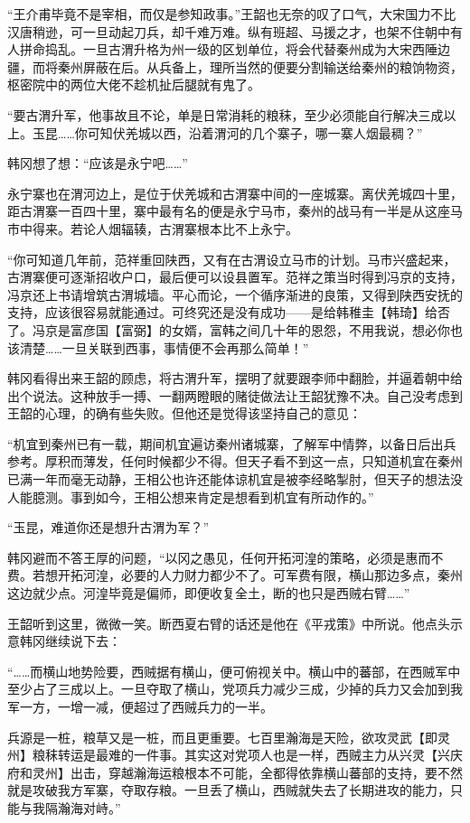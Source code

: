 “王介甫毕竟不是宰相，而仅是参知政事。”王韶也无奈的叹了口气，大宋国力不比汉唐稍逊，可一旦动起刀兵，却千难万难。纵有班超、马援之才，也架不住朝中有人拼命捣乱。一旦古渭升格为州一级的区划单位，将会代替秦州成为大宋西陲边疆，而将秦州屏蔽在后。从兵备上，理所当然的便要分割输送给秦州的粮饷物资，枢密院中的两位大佬不趁机扯后腿就有鬼了。

“要古渭升军，他事故且不论，单是日常消耗的粮秣，至少必须能自行解决三成以上。玉昆……你可知伏羌城以西，沿着渭河的几个寨子，哪一寨人烟最稠？”

韩冈想了想：“应该是永宁吧……”

永宁寨也在渭河边上，是位于伏羌城和古渭寨中间的一座城寨。离伏羌城四十里，距古渭寨一百四十里，寨中最有名的便是永宁马市，秦州的战马有一半是从这座马市中得来。若论人烟辐辏，古渭寨根本比不上永宁。

“你可知道几年前，范祥重回陕西，又有在古渭设立马市的计划。马市兴盛起来，古渭寨便可逐渐招收户口，最后便可以设县置军。范祥之策当时得到冯京的支持，冯京还上书请增筑古渭城墙。平心而论，一个循序渐进的良策，又得到陕西安抚的支持，应该很容易就能通过。可终究还是没有成功——是给韩稚圭【韩琦】给否了。冯京是富彦国【富弼】的女婿，富韩之间几十年的恩怨，不用我说，想必你也该清楚……一旦关联到西事，事情便不会再那么简单！”

韩冈看得出来王韶的顾虑，将古渭升军，摆明了就要跟李师中翻脸，并逼着朝中给出个说法。这种放手一搏、一翻两瞪眼的赌徒做法让王韶犹豫不决。自己没考虑到王韶的心理，的确有些失败。但他还是觉得该坚持自己的意见：

“机宜到秦州已有一载，期间机宜遍访秦州诸城寨，了解军中情弊，以备日后出兵参考。厚积而薄发，任何时候都少不得。但天子看不到这一点，只知道机宜在秦州已满一年而毫无动静，王相公也许还能体谅机宜是被李经略掣肘，但天子的想法没人能臆测。事到如今，王相公想来肯定是想看到机宜有所动作的。”

“玉昆，难道你还是想升古渭为军？”

韩冈避而不答王厚的问题，“以冈之愚见，任何开拓河湟的策略，必须是惠而不费。若想开拓河湟，必要的人力财力都少不了。可军费有限，横山那边多点，秦州这边就少点。河湟毕竟是偏师，即便收复全土，断的也只是西贼右臂……”

王韶听到这里，微微一笑。断西夏右臂的话还是他在《平戎策》中所说。他点头示意韩冈继续说下去：

“……而横山地势险要，西贼据有横山，便可俯视关中。横山中的蕃部，在西贼军中至少占了三成以上。一旦夺取了横山，党项兵力减少三成，少掉的兵力又会加到我军一方，一增一减，便超过了西贼兵力的一半。

兵源是一桩，粮草又是一桩，而且更重要。七百里瀚海是天险，欲攻灵武【即灵州】粮秣转运是最难的一件事。其实这对党项人也是一样，西贼主力从兴灵【兴庆府和灵州】出击，穿越瀚海运粮根本不可能，全都得依靠横山蕃部的支持，要不然就是攻破我方军寨，夺取存粮。一旦丢了横山，西贼就失去了长期进攻的能力，只能与我隔瀚海对峙。”

